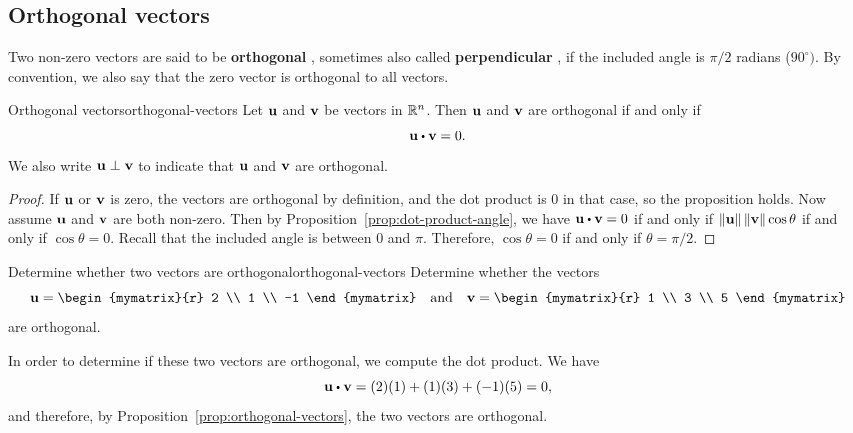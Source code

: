 \subsection{Orthogonal vectors}

Two non-zero vectors are said to be \textbf{orthogonal}%
%
, sometimes also called
\textbf{perpendicular}%
%
, if the included angle is $\pi /2$
radians ($90^{\circ })$. By convention, we also say that the zero
vector is orthogonal to all vectors.

\begin{proposition}{Orthogonal vectors}{orthogonal-vectors}
  Let $\vect{u}$ and $\vect{v}$ be vectors in $\mathbb{R}^n$. Then $\vect{u}$
  and $\vect{v}$ are orthogonal if and only
  if
  \begin{equation*}
    \vect{u} \dotprod \vect{v} = 0.
  \end{equation*}
  We also write $\vect{u}\orth\vect{v}$ to indicate that $\vect{u}$
  and $\vect{v}$ are orthogonal.
\end{proposition}

\begin{proof}
  If $\vect{u}$ or $\vect{v}$ is zero, the vectors are orthogonal by
  definition, and the dot product is $0$ in that case, so the
  proposition holds. Now assume $\vect{u}$ and $\vect{v}$ are both
  non-zero.  Then by Proposition~\ref{prop:dot-product-angle}, we have
  $\vect{u} \dotprod \vect{v} = 0$ if and only if
  $\norm{\vect{u}} \norm{\vect{v}} \cos \theta$ if and only if
  $\cos\theta=0$. Recall that the included angle is between $0$ and
  $\pi$. Therefore, $\cos\theta=0$ if and only if $\theta=\pi/2$.
\end{proof}

\begin{example}{Determine whether two vectors are orthogonal}{orthogonal-vectors}
  Determine whether the vectors
  \begin{equation*}
    \vect{u}=
    \begin{mymatrix}{r}
      2 \\
      1 \\
      -1
    \end{mymatrix}
    \quad\mbox{and}\quad
    \vect{v}
    =
    \begin{mymatrix}{r}
      1 \\
      3 \\
      5
    \end{mymatrix}
  \end{equation*}
  are orthogonal.
\end{example}

\begin{solution}
  In order to determine if these two vectors are orthogonal, we
  compute the dot product. We have
  \begin{equation*}
    \vect{u} \dotprod \vect{v}
    =
    (2)(1) + (1)(3) + (-1)(5)
    =
    0,
  \end{equation*}
  and therefore, by Proposition~\ref{prop:orthogonal-vectors}, the two vectors are orthogonal.
\end{solution}

